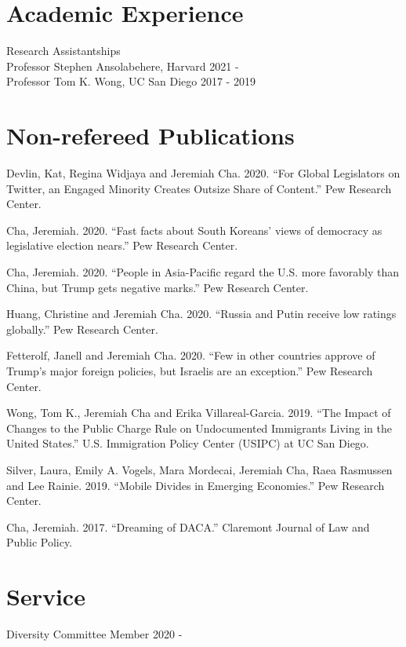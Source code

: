 \documentclass[margin, line]{res}
\begin{document}
\begin{resume}
\section{Academic Experience}
Research Assistantships \\
\hspace*{5mm} Professor Stephen Ansolabehere, Harvard \hfill 2021 - \\
\hspace*{5mm} Professor Tom K. Wong, UC San Diego \hfill 2017 - 2019

\section{Non-refereed Publications}

\begin{etaremune}
	\item Devlin, Kat, Regina Widjaya and Jeremiah Cha. 2020. ``For Global Legislators on Twitter, an Engaged Minority Creates Outsize Share of Content.'' Pew Research Center.
	\item Cha, Jeremiah. 2020. ``Fast facts about South Koreans’ views of democracy as legislative election nears.'' Pew Research Center.
	\item Cha, Jeremiah. 2020. ``People in Asia-Pacific regard the U.S. more favorably than China, but Trump gets negative marks.'' Pew Research Center.
	\item Huang, Christine and Jeremiah Cha. 2020. ``Russia and Putin receive low ratings globally.'' Pew Research Center.
	\item Fetterolf, Janell and Jeremiah Cha. 2020. ``Few in other countries approve of Trump’s major foreign policies, but Israelis are an exception.'' Pew Research Center.
	\item Wong, Tom K., Jeremiah Cha and Erika Villareal-Garcia. 2019. ``The Impact of Changes to the Public Charge Rule on Undocumented Immigrants Living in the United States.'' U.S. Immigration Policy Center (USIPC) at UC San Diego.
	\item Silver, Laura, Emily A. Vogels, Mara Mordecai, Jeremiah Cha, Raea Rasmussen and Lee Rainie. 2019. ``Mobile Divides in Emerging Economies.'' Pew Research Center.
	\item Cha, Jeremiah. 2017. ``Dreaming of DACA.'' Claremont Journal of Law and Public Policy.
\end{etaremune}



\section{Service}
Diversity Committee Member \hfill 2020 -


\end{resume}
\end{document}
